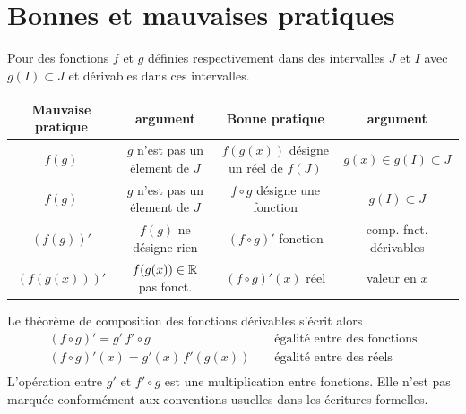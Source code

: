\section{Bonnes et mauvaises pratiques}
Pour des fonctions $f$ et $g$ définies respectivement dans des intervalles $J$ et $I$ avec $g(I)\subset J$ et dérivables dans ces intervalles.
\begin{center}
\renewcommand{\arraystretch}{2}
\begin{tabular}{|c|c|c|c|}
\hline
  Mauvaise pratique & argument & Bonne pratique & argument\\ \hline
  $f(g)$ & $g$ n'est pas un élement de $J$ &
  $f(g(x))$ désigne un réel de $f(J)$& $g(x) \in g(I) \subset J$ \\ \hline
  $f(g)$ & $g$ n'est pas un élement de $J$ &
  $f\circ g$ désigne une fonction & $g(I) \subset J$ \\ \hline 
  $(f(g))'$ & $f(g)$ ne désigne rien  &
  $(f\circ g)'$ fonction & comp. fnct. dérivables \\ \hline  
  $(f(g(x)))'$ & $f(g(x)) \in \mathbb{R}$ pas fonct.  &
  $(f\circ g)'(x)$ réel& valeur en $x$ \\ \hline  
\end{tabular}  
\end{center}
Le théorème de composition des fonctions dérivables s'écrit alors
\begin{align*}
  (f\circ g)' = g'\,f'\circ g &      & \text{ égalité entre des fonctions} \\
  (f\circ g)'(x) = g'(x)\,f'(g(x)) & & \text{ égalité entre des réels} \\
\end{align*}
L'opération entre $g'$ et $f'\circ g$ est une multiplication entre fonctions. Elle n'est pas marquée conformément aux conventions usuelles dans les écritures formelles.




